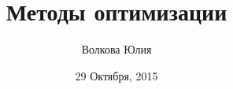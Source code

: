 \documentclass[12pt]{article}
\begin{document}
        \begin{titlepage}
		\title{Методы оптимизации}
		\date{29 Октября, 2015}
		\author{Волкова Юлия}
		\maketitle
	    \end{titlepage}

        
        
        
        
\end{document}
